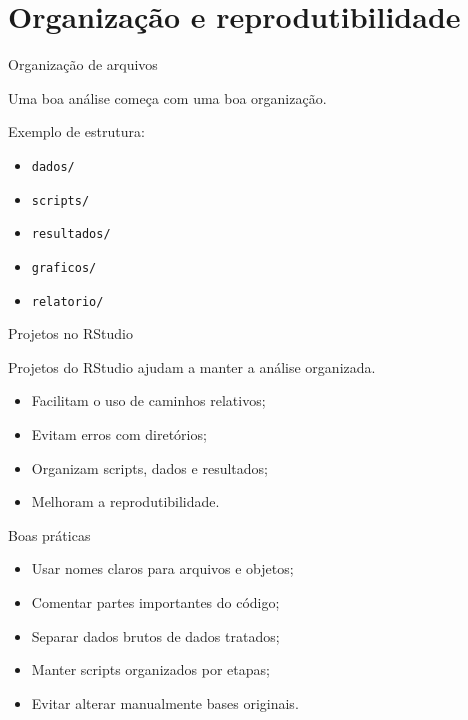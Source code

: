 \documentclass[11pt]{beamer}
\begin{document}
	\section{Organização e reprodutibilidade}
	
	\begin{frame}{Organização de arquivos}
		
		Uma boa análise começa com uma boa organização.
		
		\vspace{0.3cm}
		
		Exemplo de estrutura:
		
		\begin{itemize}
			\item \texttt{dados/}
			\item \texttt{scripts/}
			\item \texttt{resultados/}
			\item \texttt{graficos/}
			\item \texttt{relatorio/}
		\end{itemize}
		
	\end{frame}
	
	\begin{frame}{Projetos no RStudio}
		
		Projetos do RStudio ajudam a manter a análise organizada.
		
		\begin{itemize}
			\item Facilitam o uso de caminhos relativos;
			\item Evitam erros com diretórios;
			\item Organizam scripts, dados e resultados;
			\item Melhoram a reprodutibilidade.
		\end{itemize}
		
	\end{frame}
	
	\begin{frame}{Boas práticas}
		
		\begin{itemize}
			\item Usar nomes claros para arquivos e objetos;
			\item Comentar partes importantes do código;
			\item Separar dados brutos de dados tratados;
			\item Manter scripts organizados por etapas;
			\item Evitar alterar manualmente bases originais.
		\end{itemize}
		
	\end{frame}
	
\end{document}
